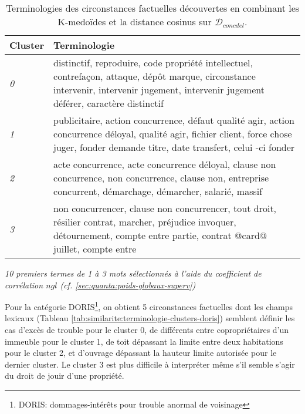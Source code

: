 \begin{table}[ht]
	\centering \scriptsize
	\begin{tabular}{|l|p{}|}
		\hline
		\textbf{Cluster} & \textbf{Terminologie} \\ \hline
		\textit{0} & distinctif, reproduire, code propriété intellectuel, contrefaçon, attaque, dépôt marque, circonstance intervenir, intervenir jugement, intervenir jugement déférer, caractère distinctif
		\\ \hline
		\textit{1} & publicitaire, action concurrence, défaut qualité agir, action concurrence déloyal, qualité agir, fichier client, force chose juger, fonder demande titre, date transfert, celui -ci fonder
		\\ \hline
		\textit{2} & acte concurrence, acte concurrence déloyal, clause non concurrence, non concurrence, clause non, entreprise concurrent, démarchage, démarcher, salarié, massif
		\\ \hline
		\textit{3} & non concurrencer, clause non concurrencer, tout droit, résilier contrat, marcher, préjudice invoquer, détournement, compte entre partie, contrat @card@ juillet, compte entre
		\\ \hline
	\end{tabular}
	
	\textit{10 premiers termes de 1 à 3 mots sélectionnés à l'aide du coefficient de corrélation $ngl$ (cf. \ref{sec:quanta:poids-globaux-superv})}
	\caption{Terminologies des circonstances factuelles découvertes en combinant les K-medoïdes et la distance cosinus sur $\mathcal{D}_{concdel}$.}\label{tab:similarite:terminologie-clusters-concdel}
\end{table}

Pour la catégorie DORIS\footnote{DORIS: dommages-intérêts pour trouble anormal de voisinage},  on obtient 5 circonstances factuelles dont les champs lexicaux (Tableau \ref{tab:similarite:terminologie-clusters-doris}) semblent définir les cas d'excès de trouble pour le cluster 0, de différents entre copropriétaires d'un immeuble pour le cluster 1, de toit dépassant la limite entre deux habitations pour le cluster 2, et d'ouvrage dépassant la hauteur limite autorisée pour le dernier cluster. Le cluster 3 est plus difficile à interpréter  même s'il semble s'agir du droit de jouir d'une propriété.

